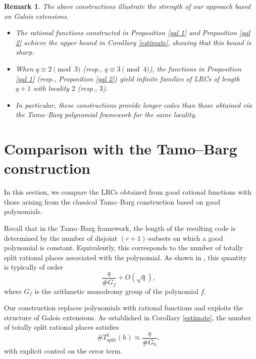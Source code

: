 \documentclass[1p,final]{elsarticle}
\newtheorem{open problem}[theorem]{Open Problem}
\newtheorem{remark}[theorem]{Remark}
\begin{document}
\begin{remark}
The above constructions illustrate the strength of our approach based on Galois extensions.

\medskip

\begin{itemize}
\item The rational functions constructed in Proposition \ref{gal 1} and Proposition \ref{gal 2} achieve the upper bound in Corollary \ref{estimate}, showing that this bound is sharp.

\item When $q\equiv 2 \pmod{3}$ (resp., $q\equiv 3\pmod{4}$), the functions in Proposition \ref{gal 1} (resp., Proposition \ref{gal 2}) yield infinite families of LRCs of length $q+1$ with locality $2$ (resp., $3$).

\item In particular, these constructions provide longer codes than those obtained via the Tamo--Barg polynomial framework for the same locality.
\end{itemize}

\end{remark}

\section{Comparison with the Tamo--Barg construction}\label{comparison}

In this section, we compare the LRCs obtained from good rational functions with those arising from the classical Tamo--Barg construction based on good polynomials.

\medskip

Recall that in the Tamo--Barg framework, the length of the resulting code is determined by the number of disjoint $(r+1)$-subsets on which a good polynomial is constant. Equivalently, this corresponds to the number of totally split rational places associated with the polynomial. As shown in \cite{Micheli 2020}, this quantity is typically of order
\[
\frac{q}{\#G_f} + O(\sqrt{q}),
\]
where $G_f$ is the arithmetic monodromy group of the polynomial $f$.

\medskip

Our construction replaces polynomials with rational functions and exploits the structure of Galois extensions. As established in Corollary \ref{estimate}, the number of totally split rational places satisfies
\[
\# T_{\text{split}}^1(h) \approx \frac{q}{\#G_h},
\]
with explicit control on the error term.
\end{document}
